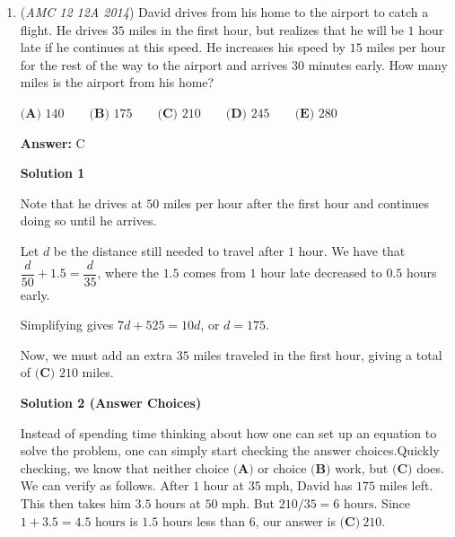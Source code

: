 \begin{enumerate}
 
Additional Insight:After noting that the congruent sides meet at the circumcenter, you can just use the Extended Law of Sines to see that $R = \dfrac{1}{2\sin 60^{\circ}} = \dfrac{\sqrt{3}}{3}$, which is choice B~Extremelysupercooldude

 solution by sugar\_rush

 


	\item (\textit{AMC 12 12A 2014}) David drives from his home to the airport to catch a flight.  He drives $35$ miles in the first hour, but realizes that he will be $1$ hour late if he continues at this speed.  He increases his speed by $15$ miles per hour for the rest of the way to the airport and arrives $30$ minutes early.  How many miles is the airport from his home?


 $\textbf{(A) }140\qquad \textbf{(B) }175\qquad \textbf{(C) }210\qquad \textbf{(D) }245\qquad \textbf{(E) }280\qquad$

 \textbf{Answer: }C



\textbf{Solution 1}

Note that he drives at $50$ miles per hour after the first hour and continues doing so until he arrives.

 Let $d$ be the distance still needed to travel after $1$ hour. We have that $\dfrac{d}{50}+1.5=\dfrac{d}{35}$, where the $1.5$ comes from $1$ hour late decreased to $0.5$ hours early.

 Simplifying gives $7d+525=10d$, or $d=175$.

 Now, we must add an extra $35$ miles traveled in the first hour, giving a total of $\boxed{\textbf{(C) } 210}$ miles.

 



\textbf{Solution 2 (Answer Choices)}

Instead of spending time thinking about how one can set up an equation to solve the problem, one can simply start checking the answer choices.Quickly checking, we know that neither choice $\textbf{(A)}$ or choice $\textbf{(B)}$ work, but $\textbf{(C)}$ does. We can verify as follows. After $1$ hour at $35 \text{ mph}$, David has $175$ miles left. This then takes him $3.5$ hours at $50 \text{ mph}$. But $210/35 = 6 \text{ hours}$. Since $1+3.5 = 4.5 \text{ hours}$ is $1.5$ hours less than $6$, our answer is $\boxed{\textbf{(C)} \: 210}$.

 




\end{enumerate}
